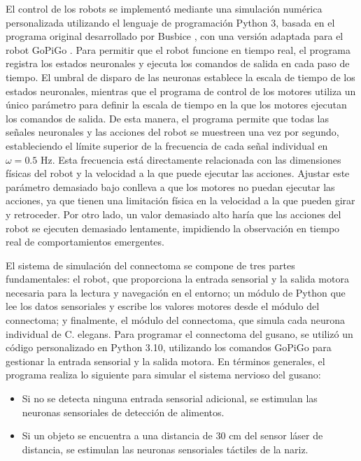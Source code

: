 El control de los robots se implementó mediante una simulación numérica personalizada utilizando el lenguaje de programación Python 3, basada en el programa original desarrollado por Busbice \cite{busbice_extending_nodate}, con una versión adaptada para el robot GoPiGo \cite{noauthor_gopigo_2023}. Para permitir que el robot funcione en tiempo real, el programa registra los estados neuronales y ejecuta los comandos de salida en cada paso de tiempo. El umbral de disparo de las neuronas establece la escala de tiempo de los estados neuronales, mientras que el programa de control de los motores utiliza un único parámetro para definir la escala de tiempo en la que los motores ejecutan los comandos de salida. De esta manera, el programa permite que todas las señales neuronales y las acciones del robot se muestreen una vez por segundo, estableciendo el límite superior de la frecuencia de cada señal individual en $\omega  = 0.5$ Hz. Esta frecuencia está directamente relacionada con las dimensiones físicas del robot y la velocidad a la que puede ejecutar las acciones. Ajustar este parámetro demasiado bajo conlleva a que los motores no puedan ejecutar las acciones, ya que tienen una limitación física en la velocidad a la que pueden girar y retroceder. Por otro lado, un valor demasiado alto haría que las acciones del robot se ejecuten demasiado lentamente, impidiendo la observación en tiempo real de comportamientos emergentes.

El sistema de simulación del connectoma se compone de tres partes fundamentales: el robot, que proporciona la entrada sensorial y la salida motora necesaria para la lectura y navegación en el entorno; un módulo de Python que lee los datos sensoriales y escribe los valores motores desde el módulo del connectoma; y finalmente, el módulo del connectoma, que simula cada neurona individual de C. elegans. Para programar el connectoma del gusano, se utilizó un código personalizado en Python 3.10, utilizando los comandos GoPiGo para gestionar la entrada sensorial y la salida motora. En términos generales, el programa realiza lo siguiente para simular el sistema nervioso del gusano:

\begin{itemize}
\item Si no se detecta ninguna entrada sensorial adicional, se estimulan las neuronas sensoriales de detección de alimentos.
\item Si un objeto se encuentra a una distancia de 30 cm del sensor láser de distancia, se estimulan las neuronas sensoriales táctiles de la nariz.
\end{itemize}

